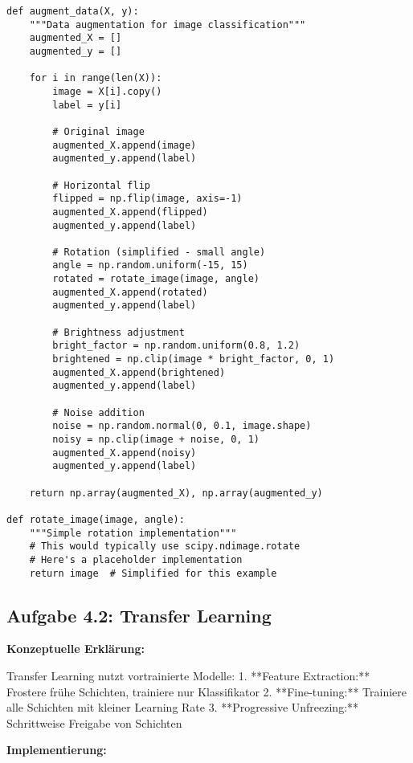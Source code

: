 ﻿\documentclass[12pt,a4paper]{article}
\begin{document}
\begin{lstlisting}
def augment_data(X, y):
    """Data augmentation for image classification"""
    augmented_X = []
    augmented_y = []
    
    for i in range(len(X)):
        image = X[i].copy()
        label = y[i]
        
        # Original image
        augmented_X.append(image)
        augmented_y.append(label)
        
        # Horizontal flip
        flipped = np.flip(image, axis=-1)
        augmented_X.append(flipped)
        augmented_y.append(label)
        
        # Rotation (simplified - small angle)
        angle = np.random.uniform(-15, 15)
        rotated = rotate_image(image, angle)
        augmented_X.append(rotated)
        augmented_y.append(label)
        
        # Brightness adjustment
        bright_factor = np.random.uniform(0.8, 1.2)
        brightened = np.clip(image * bright_factor, 0, 1)
        augmented_X.append(brightened)
        augmented_y.append(label)
        
        # Noise addition
        noise = np.random.normal(0, 0.1, image.shape)
        noisy = np.clip(image + noise, 0, 1)
        augmented_X.append(noisy)
        augmented_y.append(label)
    
    return np.array(augmented_X), np.array(augmented_y)

def rotate_image(image, angle):
    """Simple rotation implementation"""
    # This would typically use scipy.ndimage.rotate
    # Here's a placeholder implementation
    return image  # Simplified for this example
\end{lstlisting}

\subsection{Aufgabe 4.2: Transfer Learning}

\textbf{Konzeptuelle Erklärung:}

Transfer Learning nutzt vortrainierte Modelle:
1. **Feature Extraction:** Frostere frühe Schichten, trainiere nur Klassifikator
2. **Fine-tuning:** Trainiere alle Schichten mit kleiner Learning Rate
3. **Progressive Unfreezing:** Schrittweise Freigabe von Schichten

\textbf{Implementierung:}
\end{document}
